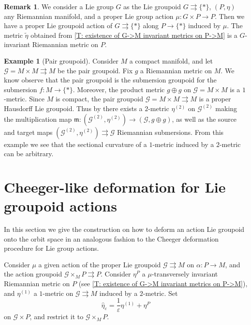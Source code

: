 \documentclass[12pt,a4paper,reqno]{amsart}
\newcommand{\1}{\mathbbm{1}} %
\newcommand{\G}{\mathcal{G}} %
\newcommand{\m}{\mathfrak{m}} %
\theoremstyle{definition}
\newtheorem{remark}[thm]{Remark}
\newtheorem{example}[thm]{Example}
\theoremstyle{TheoremNum}
\begin{document}
\begin{remark}
We consider a Lie group $G$ as the Lie groupoid $G\rightrightarrows \{\ast\}$,  $(P,\eta)$ any Riemannian manifold, and a proper Lie group action $\mu\colon G\times P\to P$.  Then we have a proper Lie groupoid action of $G\rightrightarrows \{\ast\}$ along $P\to\{\ast\}$ induced by $\mu$. The metric $\tilde{\eta}$ obtained from \th\ref{T: existence of G->M invariant metrics on P->M} is a $G$-invariant Riemannian metric on $P$. 
\end{remark}

\begin{example}[Pair groupoid]\th\label{Ex: Pair groupoid as a Riemannian groupoid}
Consider $M$ a compact manifold, and let $\G = M\times M\rightrightarrows M$ be the pair groupoid. Fix $g$ a Riemannian metric on $M$. We know observe that the pair groupoid is the submersion groupoid for the submersion $f\colon M\to \{\ast\}$. Moreover, the product metric $g\oplus g$ on $\G = M\times M$ is a $1$-metric. Since $M$ is compact, the pair groupoid $\G= M\times M\rightrightarrows M$ is a proper Hausdorff Lie groupoid. Thus by \cite[Theorem~4.13]{delHoyoFernandes2018} there exists a $2$-metric $\eta^{(2)}$ on $\G^{(2)}$ making the multiplication map $\m\colon (\G^{(2)},\eta^{(2)})\to (\G,g\oplus g)$, as well as the source and target maps $(\G^{(2)},\eta^{(2)})\rightrightarrows\G$ Riemannian submersions. From this example we see that the sectional curvature of a $1$-metric induced by a $2$-metric can be arbitrary.
\end{example}

\section{Cheeger-like deformation for Lie groupoid actions}\label{S: Cheeger like deformation for Lie groupoids actions}


In this section we give the construction on how to deform an action Lie groupoid  onto the orbit space in an analogous fashion to the Cheeger deformation procedure for Lie group actions.


Consider $\mu$ a given action of the proper Lie groupoid $\G\rightrightarrows M$ on $\alpha\colon P\to M$, and the action groupoid $\G\times_M P\rightrightarrows P$. Consider $\eta^P$ a $\mu$-transversely invariant Riemannian metric on $P$ (see \th\ref{T: existence of G->M invariant metrics on P->M}), and $\eta^{(1)}$ a $1$-metric on $\G\rightrightarrows M$ induced by a $2$-metric. Set 
\begin{equation}\label{EQ: Cheeger deformation metric}
\widehat{\eta}_{\varepsilon} = \frac{1}{\varepsilon}\eta^{(1)} + \eta^P
\end{equation}
on $\G\times P$, and restrict it to $\G\times_M P$.
\end{document}
